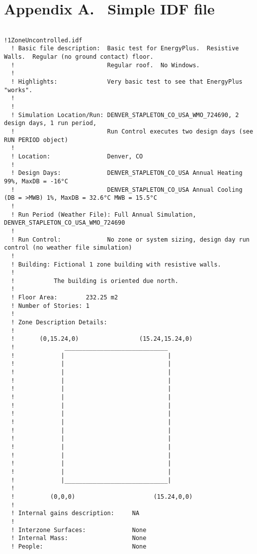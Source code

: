 \chapter{Appendix A.~ Simple IDF file}\label{appendix-a.-simple-idf-file}

\begin{lstlisting}

!1ZoneUncontrolled.idf
  ! Basic file description:  Basic test for EnergyPlus.  Resistive Walls.  Regular (no ground contact) floor.
  !                          Regular roof.  No Windows.
  !
  ! Highlights:              Very basic test to see that EnergyPlus "works".
  !
  !
  ! Simulation Location/Run: DENVER_STAPLETON_CO_USA_WMO_724690, 2 design days, 1 run period,
  !                          Run Control executes two design days (see RUN PERIOD object)
  !
  ! Location:                Denver, CO
  !
  ! Design Days:             DENVER_STAPLETON_CO_USA Annual Heating 99%, MaxDB = -16°C
  !                          DENVER_STAPLETON_CO_USA Annual Cooling (DB = >MWB) 1%, MaxDB = 32.6°C MWB = 15.5°C
  !
  ! Run Period (Weather File): Full Annual Simulation, DENVER_STAPLETON_CO_USA_WMO_724690
  !
  ! Run Control:             No zone or system sizing, design day run control (no weather file simulation)
  !
  ! Building: Fictional 1 zone building with resistive walls.
  !
  !           The building is oriented due north.
  !
  ! Floor Area:        232.25 m2
  ! Number of Stories: 1
  !
  ! Zone Description Details:
  !
  !       (0,15.24,0)                 (15.24,15.24,0)
  !              _____________________________
  !             |                             |
  !             |                             |
  !             |                             |
  !             |                             |
  !             |                             |
  !             |                             |
  !             |                             |
  !             |                             |
  !             |                             |
  !             |                             |
  !             |                             |
  !             |                             |
  !             |                             |
  !             |                             |
  !             |                             |
  !             |_____________________________|
  !
  !          (0,0,0)                      (15.24,0,0)
  !
  ! Internal gains description:     NA
  !
  ! Interzone Surfaces:             None
  ! Internal Mass:                  None
  ! People:                         None

\end{lstlisting}
